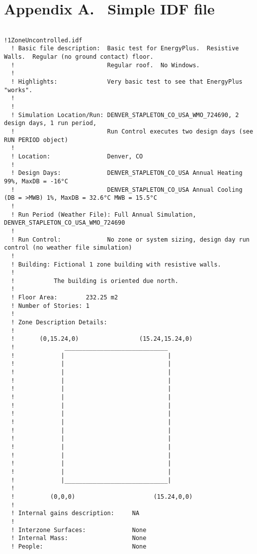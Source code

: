 \chapter{Appendix A.~ Simple IDF file}\label{appendix-a.-simple-idf-file}

\begin{lstlisting}

!1ZoneUncontrolled.idf
  ! Basic file description:  Basic test for EnergyPlus.  Resistive Walls.  Regular (no ground contact) floor.
  !                          Regular roof.  No Windows.
  !
  ! Highlights:              Very basic test to see that EnergyPlus "works".
  !
  !
  ! Simulation Location/Run: DENVER_STAPLETON_CO_USA_WMO_724690, 2 design days, 1 run period,
  !                          Run Control executes two design days (see RUN PERIOD object)
  !
  ! Location:                Denver, CO
  !
  ! Design Days:             DENVER_STAPLETON_CO_USA Annual Heating 99%, MaxDB = -16°C
  !                          DENVER_STAPLETON_CO_USA Annual Cooling (DB = >MWB) 1%, MaxDB = 32.6°C MWB = 15.5°C
  !
  ! Run Period (Weather File): Full Annual Simulation, DENVER_STAPLETON_CO_USA_WMO_724690
  !
  ! Run Control:             No zone or system sizing, design day run control (no weather file simulation)
  !
  ! Building: Fictional 1 zone building with resistive walls.
  !
  !           The building is oriented due north.
  !
  ! Floor Area:        232.25 m2
  ! Number of Stories: 1
  !
  ! Zone Description Details:
  !
  !       (0,15.24,0)                 (15.24,15.24,0)
  !              _____________________________
  !             |                             |
  !             |                             |
  !             |                             |
  !             |                             |
  !             |                             |
  !             |                             |
  !             |                             |
  !             |                             |
  !             |                             |
  !             |                             |
  !             |                             |
  !             |                             |
  !             |                             |
  !             |                             |
  !             |                             |
  !             |_____________________________|
  !
  !          (0,0,0)                      (15.24,0,0)
  !
  ! Internal gains description:     NA
  !
  ! Interzone Surfaces:             None
  ! Internal Mass:                  None
  ! People:                         None

\end{lstlisting}
